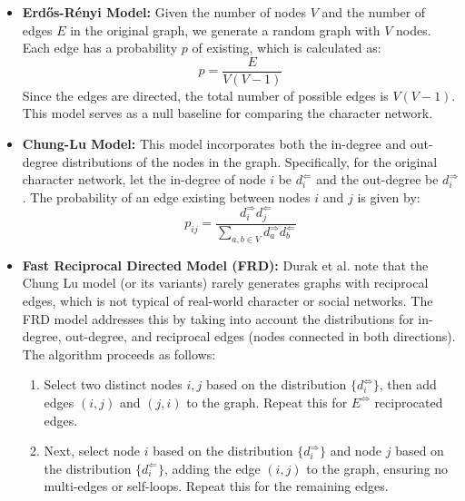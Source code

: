 \documentclass{article} %
\begin{document}
\begin{itemize}
    \item \textbf{Erdős-Rényi Model:} Given the number of nodes \(V\) and the number of edges \(E\) in the original graph, we generate a random graph with \(V\) nodes. Each edge has a probability \(p\) of existing, which is calculated as:
    \[
    p = \frac{E}{V(V - 1)}
    \]
    Since the edges are directed, the total number of possible edges is \(V(V-1)\). This model serves as a null baseline for comparing the character network.

    \item \textbf{Chung-Lu Model:} This model incorporates both the in-degree and out-degree distributions of the nodes in the graph. Specifically, for the original character network, let the in-degree of node \(i\) be \(d^\Leftarrow_i\) and the out-degree be \(d^\Rightarrow_i\). The probability of an edge existing between nodes \(i\) and \(j\) is given by:
    \[
    p_{ij} = \frac{d^\Rightarrow_i d^\Leftarrow_j}{\sum_{a, b \in V} d^\Rightarrow_a d^\Leftarrow_b}
    \]

    \item \textbf{Fast Reciprocal Directed Model (FRD):} Durak et al. note that the Chung Lu model (or its variants) rarely generates graphs with reciprocal edges, which is not typical of real-world character or social networks. The FRD model addresses this by taking into account the distributions for in-degree, out-degree, and reciprocal edges (nodes connected in both directions). The algorithm proceeds as follows:
    \begin{enumerate}
        \item Select two distinct nodes \(i, j\) based on the distribution \(\{d^\Leftrightarrow_i\}\), then add edges \((i, j)\) and \((j, i)\) to the graph. Repeat this for \(E^\Leftrightarrow\) reciprocated edges.
        \item Next, select node \(i\) based on the distribution \(\{d^\Rightarrow_i\}\) and node \(j\) based on the distribution \(\{d^\Leftarrow_i\}\), adding the edge \((i, j)\) to the graph, ensuring no multi-edges or self-loops. Repeat this for the remaining edges.
    \end{enumerate}


\end{itemize}
\end{document}
